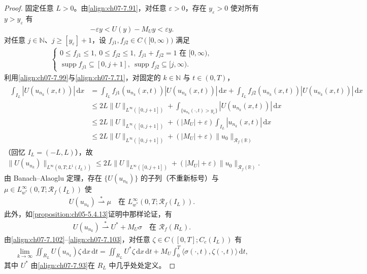 \documentclass[../../main.tex]{subfiles}%
\begin{document}
\begin{proof}
固定任意 $L>0$。由\eqref{align:ch07-7.91}，对任意 $\varepsilon>0$，存在 $y_\varepsilon>0$ 使对所有 $y>y_\varepsilon$ 有
\begin{align}
-\varepsilon y<U(y)-M_U y<\varepsilon y. \label{align:ch07-7.99}
\end{align}
对任意 $j\in\mathbb{N}$、$j\geqslant[y_\varepsilon]+1$，设 $f_{j1},f_{j2}\in C([0,\infty))$ 满足
\begin{align}
\begin{cases}
0\leqslant f_{j1}\leqslant1,\ 0\leqslant f_{j2}\leqslant1,\ f_{j1}+f_{j2}=1\text{ 在 }[0,\infty),\\
\operatorname{supp}f_{j1}\subseteq[0,j+1],\ \operatorname{supp}f_{j2}\subseteq[j,\infty).
\end{cases} 
\label{align:ch07-7.100}
\end{align}
利用\eqref{align:ch07-7.99}与\eqref{align:ch07-7.71}，对固定的 $k\in\mathbb{N}$ 与 $t\in(0,T)$，
\begin{align*}
\begin{aligned}
\int_{I_L}|U(u_{n_k}(x,t))|\,\mathrm{d}x
&=\int_{I_L}f_{j1}(u_{n_k}(x,t))|U(u_{n_k}(x,t))|\,\mathrm{d}x+\int_{I_L}f_{j2}(u_{n_k}(x,t))|U(u_{n_k}(x,t))|\,\mathrm{d}x\\
&\leqslant2L\|U\|_{L^\infty([0,j+1])}+\int_{\{u_{n_k}(\cdot,t)>y_\varepsilon\}}|U(u_{n_k}(x,t))|\,\mathrm{d}x\\
&\leqslant2L\|U\|_{L^\infty([0,j+1])}+(|M_U|+\varepsilon)\int_{I_L}|u_{n_k}(x,t)|\,\mathrm{d}x\\
&\leqslant2L\|U\|_{L^\infty([0,j+1])}+(|M_U|+\varepsilon)\|u_0\|_{\mathscr{R}_f(\mathbb{R})}
\end{aligned}
\end{align*}
（回忆 $I_L=(-L,L)$），故
\begin{align}
\|U(u_{n_k})\|_{L^\infty(0,T;L^1(I_L))}\leqslant2L\|U\|_{L^\infty([0,j+1])}+(|M_U|+\varepsilon)\|u_0\|_{\mathscr{R}_f(\mathbb{R})}. \label{align:ch07-7.101}
\end{align}
由 Banach--Alaoglu 定理，存在 $\{U(u_{n_k})\}$ 的子列（不重新标号）与 $\mu\in L^\infty_{w^*}(0,T;\mathscr{R}_f(I_L))$ 使
\begin{align}
U(u_{n_k})\stackrel{*}{\rightharpoonup}\mu\quad\text{在 }L^\infty_{w^*}(0,T;\mathscr{R}_f(I_L)). \label{align:ch07-7.102}
\end{align}
此外，如\cref{proposition:ch05-5.4.13}证明中那样论证，有
\begin{align}
U(u_{n_k})\stackrel{*}{\rightharpoonup}U^*+M_U\sigma\quad\text{在 }\mathscr{R}_f(R_L). \label{align:ch07-7.103}
\end{align}
由\eqref{align:ch07-7.102}--\eqref{align:ch07-7.103}，对任意 $\zeta\in C([0,T];C_c(I_L))$ 有
\begin{align}
\lim_{k\to\infty}\iint_{R_L}U(u_{n_k})\zeta\,\mathrm{d}x\,\mathrm{d}t
=\iint_{R_L}U^*\zeta\,\mathrm{d}x\,\mathrm{d}t+M_U\int_0^T\langle\sigma(\cdot,t),\zeta(\cdot,t)\rangle\,\mathrm{d}t, \label{align:ch07-7.104}
\end{align}
其中 $U^*$ 由\eqref{align:ch07-7.93}在 $R_L$ 中几乎处处定义。


\end{proof}
\end{document}
